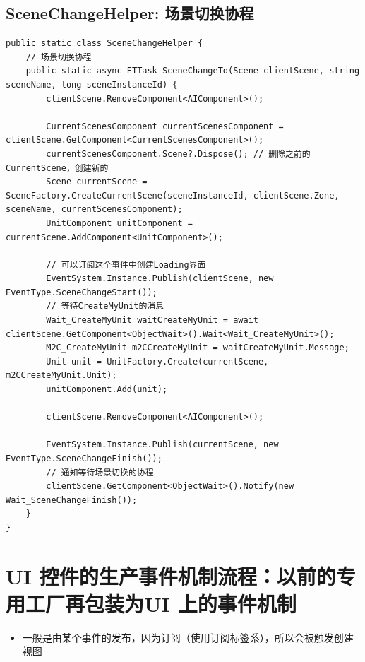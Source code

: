 \documentclass[9pt, b5paper]{article}
\begin{document}
\subsection{SceneChangeHelper: 场景切换协程}
\label{sec-6-4}
\begin{verbatim}
public static class SceneChangeHelper {
    // 场景切换协程
    public static async ETTask SceneChangeTo(Scene clientScene, string sceneName, long sceneInstanceId) {
        clientScene.RemoveComponent<AIComponent>();

        CurrentScenesComponent currentScenesComponent = clientScene.GetComponent<CurrentScenesComponent>();
        currentScenesComponent.Scene?.Dispose(); // 删除之前的CurrentScene，创建新的
        Scene currentScene = SceneFactory.CreateCurrentScene(sceneInstanceId, clientScene.Zone, sceneName, currentScenesComponent);
        UnitComponent unitComponent = currentScene.AddComponent<UnitComponent>();

        // 可以订阅这个事件中创建Loading界面
        EventSystem.Instance.Publish(clientScene, new EventType.SceneChangeStart());
        // 等待CreateMyUnit的消息
        Wait_CreateMyUnit waitCreateMyUnit = await clientScene.GetComponent<ObjectWait>().Wait<Wait_CreateMyUnit>();
        M2C_CreateMyUnit m2CCreateMyUnit = waitCreateMyUnit.Message;
        Unit unit = UnitFactory.Create(currentScene, m2CCreateMyUnit.Unit);
        unitComponent.Add(unit);

        clientScene.RemoveComponent<AIComponent>();

        EventSystem.Instance.Publish(currentScene, new EventType.SceneChangeFinish());
        // 通知等待场景切换的协程
        clientScene.GetComponent<ObjectWait>().Notify(new Wait_SceneChangeFinish());
    }
}
\end{verbatim}

\section{UI 控件的生产事件机制流程：以前的专用工厂再包装为UI 上的事件机制}
\label{sec-7}
\begin{itemize}
\item 一般是由某个事件的发布，因为订阅（使用订阅标签系），所以会被触发创建视图
\end{itemize}
\end{document}
